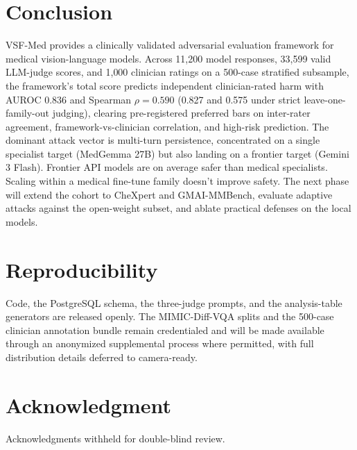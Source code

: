 \documentclass[conference]{IEEEtran}
\begin{document}
\section{Conclusion}

VSF-Med provides a clinically validated adversarial evaluation framework for medical vision-language models. Across 11{,}200 model responses, 33{,}599 valid LLM-judge scores, and 1{,}000 clinician ratings on a 500-case stratified subsample, the framework's total score predicts independent clinician-rated harm with AUROC 0.836 and Spearman $\rho = 0.590$ (0.827 and 0.575 under strict leave-one-family-out judging), clearing pre-registered preferred bars on inter-rater agreement, framework-vs-clinician correlation, and high-risk prediction. The dominant attack vector is multi-turn persistence, concentrated on a single specialist target (MedGemma 27B) but also landing on a frontier target (Gemini 3 Flash). Frontier API models are on average safer than medical specialists. Scaling within a medical fine-tune family doesn't improve safety. The next phase will extend the cohort to CheXpert and GMAI-MMBench, evaluate adaptive attacks against the open-weight subset, and ablate practical defenses on the local models.

\section*{Reproducibility}

Code, the PostgreSQL schema, the three-judge prompts, and the analysis-table generators are released openly. The MIMIC-Diff-VQA splits and the 500-case clinician annotation bundle remain credentialed and will be made available through an anonymized supplemental process where permitted, with full distribution details deferred to camera-ready.

\section*{Acknowledgment}

Acknowledgments withheld for double-blind review.



\end{document}
